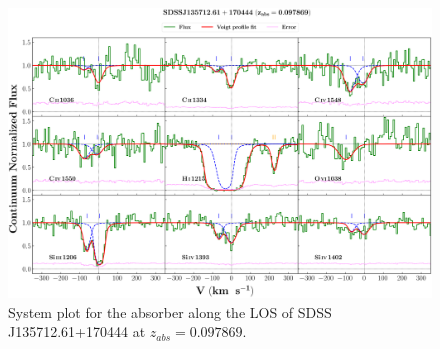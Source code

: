   
  \newpage
  \thispagestyle{empty}
  
  \begin{landscape}
  
  \begin{figure}
      \centering
      \vspace{-10mm}
      \hspace*{-20mm}
      \includegraphics[width=1.1\linewidth]{System-Plots/SDSSJ135712.61+170444_z=0.097869_sys_plot.png}
      \caption{System plot for the absorber along the LOS of SDSS J135712.61+170444 at $z_{abs} = 0.097869$. }
  \end{figure}
  
  \end{landscape}
  
  
